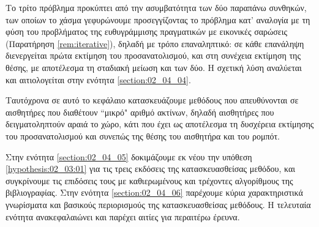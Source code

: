 Το τρίτο πρόβλημα προκύπτει από την ασυμβατότητα των δύο παραπάνω συνθηκών, των
οποίων το χάσμα γεφυρώνουμε προσεγγίζοντας το πρόβλημα
κατ' αναλογία με τη φύση του προβλήματος της ευθυγράμμισης πραγματικών με
εικονικές σαρώσεις (Παρατήρηση \ref{rem:iterative}), δηλαδή με τρόπο
επαναληπτικό: σε κάθε επανάληψη διενεργείται πρώτα εκτίμηση του
προσανατολισμού, και στη συνέχεια εκτίμηση της θέσης, με αποτέλεσμα τη σταδιακή
μείωση και των δύο. Η σχετική λύση αναλύεται και αιτιολογείται στην ενότητα
\ref{section:02_04_04}.

Ταυτόχρονα σε αυτό το κεφάλαιο κατασκευάζουμε μεθόδους που απευθύνονται σε
αισθητήρες που διαθέτουν ``μικρό" αριθμό ακτίνων, δηλαδή αισθητήρες που
δειγματοληπτούν αραιά το χώρο, κάτι που έχει ως αποτέλεσμα τη δυσχέρεια
εκτίμησης του προσανατολισμού και συνεπώς της θέσης του αισθητήρα και του
ρομπότ.

Στην ενότητα \ref{section:02_04_05} δοκιμάζουμε εκ νέου την υπόθεση
\ref{hypothesis:02_03:01} για τις τρεις εκδόσεις της κατασκευασθείσας μεθόδου,
και συγκρίνουμε τις επιδόσεις τους με καθιερωμένους και τρέχοντες αλγορίθμους
της βιβλιογραφίας. Στην ενότητα \ref{section:02_04_06} παρέχουμε κύρια
χαρακτηριστικά γνωρίσματα και βασικούς περιορισμούς της κατασκευασθείσας
μεθόδους. Η τελευταία ενότητα ανακεφαλαιώνει και παρέχει αιτίες για περαιτέρω
έρευνα.
